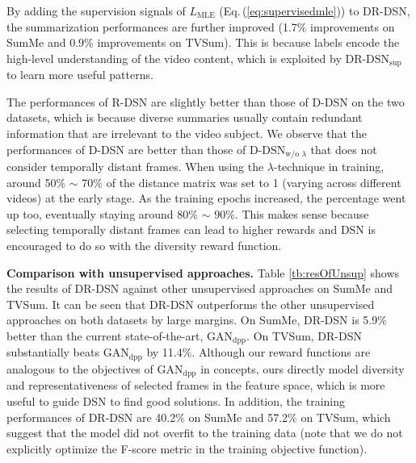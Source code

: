 \documentclass[letterpaper]{article} \usepackage{aaai18}  \usepackage{times}  \usepackage{helvet}  \usepackage{courier}  \usepackage{url}  \usepackage{graphicx}
\begin{document}
By adding the supervision signals of $L_\text{MLE}$ (Eq.\,(\ref{eq:supervisedmle})) to DR-DSN, the summarization performances are further improved (1.7$\%$ improvements on SumMe and 0.9$\%$ improvements on TVSum). This is because labels encode the high-level understanding of the video content, which is exploited by $\text{DR-DSN}_\text{sup}$ to learn more useful patterns. 

The performances of R-DSN are slightly better than those of D-DSN on the two datasets, which is because diverse summaries usually contain redundant information that are irrelevant to the video subject. We observe that the performances of D-DSN are better than those of $\text{D-DSN}_{\text{w/o $\lambda$}}$ that does not consider temporally distant frames. When using the $\lambda$-technique in training, around 50$\%$ $\sim$ 70$\%$ of the distance matrix was set to 1 (varying across different videos) at the early stage. As the training epochs increased, the percentage went up too, eventually staying around 80$\%$ $\sim$ 90$\%$. This makes sense because selecting temporally distant frames can lead to higher rewards and DSN is encouraged to do so with the diversity reward function.

{\bf Comparison with unsupervised approaches.} Table \ref{tb:resOfUnsup} shows the results of DR-DSN against other unsupervised approaches on SumMe and TVSum. It can be seen that DR-DSN outperforms the other unsupervised approaches on both datasets by large margins. On SumMe, DR-DSN is 5.9$\%$ better than the current state-of-the-art, $\text{GAN}_\text{dpp}$. On TVSum, DR-DSN substantially beats $\text{GAN}_\text{dpp}$ by 11.4$\%$. Although our reward functions are analogous to the objectives of $\text{GAN}_\text{dpp}$ in concepts, ours directly model diversity and representativeness of selected frames in the feature space, which is more useful to guide DSN to find good solutions. In addition, the training performances of DR-DSN are 40.2$\%$ on SumMe and 57.2$\%$ on TVSum, which suggest that the model did not overfit to the training data (note that we do not explicitly optimize the F-score metric in the training objective function).
\end{document}
